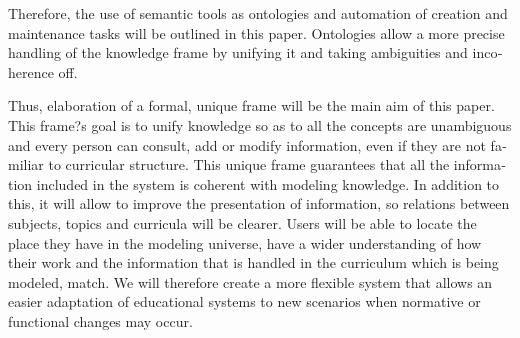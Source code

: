 \begin{otherlanguage}{english}
Therefore, the use of semantic tools as ontologies and automation of creation and maintenance tasks will be outlined in this paper. Ontologies allow a more precise handling of the knowledge frame by unifying it and taking ambiguities and incoherence off. 

Thus, elaboration of a formal, unique frame will be the main aim of this paper. This frame?s goal is to unify knowledge so as to all the concepts are unambiguous and every person can consult, add or modify information, even if they are not familiar to curricular structure. This unique frame guarantees that all the information included in the system is coherent with modeling knowledge. In addition to this, it will allow to improve the presentation of information, so relations between subjects, topics and curricula will be clearer. Users will be able to locate the place they have in the modeling universe, have a wider understanding of how their work and the information that is handled in the curriculum which is being modeled, match. We will therefore create a more flexible system that allows an easier adaptation of educational systems to new scenarios when normative or functional changes may occur. 

\end{otherlanguage}

